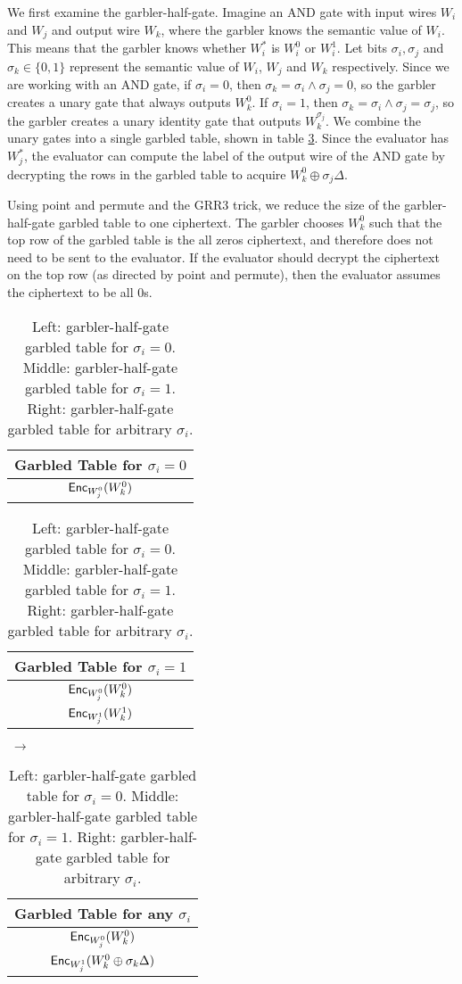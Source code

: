 We first examine the garbler-half-gate.
Imagine an AND gate with input wires $W_i$ and $W_j$ and output wire $W_k$, where the garbler knows the semantic value of $W_i$.
This means that the garbler knows whether $W_i^*$ is $W_i^0$ or $W_i^1$.
Let bits $\sigma_i, \sigma_j$ and $\sigma_k \in \{0,1\}$ represent the semantic value of $W_i$, $W_j$ and $W_k$ respectively.
Since we are working with an AND gate, if $\sigma_i = 0$, then $\sigma_k = \sigma_i \wedge \sigma_j = 0$, so the garbler creates a unary gate that always outputs $W_k^0$.
If $\sigma_i = 1$, then $\sigma_k = \sigma_i \wedge \sigma_j = \sigma_j$, so the garbler creates a unary identity gate that outputs $W_k^{\sigma_j}$.
We combine the unary gates into a single garbled table, shown in table \ref{tbl:halfgate-gg-garb}.
Since the evaluator has $W_j^*$, the evaluator can compute the label of the output wire of the AND gate by decrypting the rows in the garbled table to acquire $W_k^0 \oplus \sigma_j \Delta$.

Using point and permute and the GRR3 trick, we reduce the size of the garbler-half-gate garbled table to one ciphertext.
The garbler chooses $W_k^0$ such that the top row of the garbled table is the all zeros ciphertext, and therefore does not need to be sent to the evaluator.
If the evaluator should decrypt the ciphertext on the top row (as directed by point and permute), then the evaluator assumes the ciphertext to be all 0s.

\begin{table}[]
    \centering
    \footnotesize
    \begin{tabular}{|c|}
        \hline
        Garbled Table for $\sigma_i = 0$ \\
        \hline
        $\textsf{Enc}_{W_j^0}(W_k^0)$ \\
        \hline
    \end{tabular}
    \begin{tabular}{|c|}
        \hline
        Garbled Table for $\sigma_i = 1$ \\
        \hline
        $\textsf{Enc}_{W_j^0}(W_k^0)$ \\
        $\textsf{Enc}_{W_j^1}(W_k^1)$ \\
        \hline
    \end{tabular} $\;\rightarrow$
    \begin{tabular}{|c|}
        \hline
        Garbled Table for any $\sigma_i$ \\
        \hline
        $\textsf{Enc}_{W_j^0}(W_k^0)$ \\
        $\textsf{Enc}_{W_j^1}(W_k^0 \oplus \sigma_k\Delta)$ \\
        \hline
    \end{tabular}
    \caption[Garbler-half-gate garbled table]{Left: garbler-half-gate garbled table for $\sigma_i = 0$. Middle: garbler-half-gate garbled table for $\sigma_i = 1$. Right: garbler-half-gate garbled table for arbitrary $\sigma_i$.}
        \label{tbl:halfgate-gg-garb}
\end{table}

